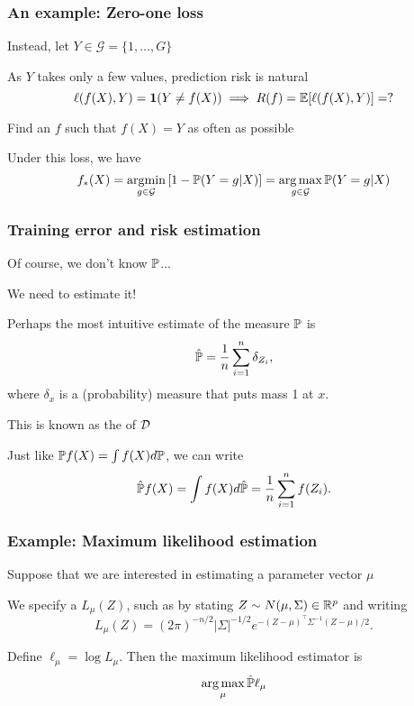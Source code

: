 \documentclass{beamer}
\begin{document}
\begin{frame}
\frametitle{An example: Zero-one loss}
Instead, let $Y \in \mathcal{G} = \{1,\ldots, G\}$ 
\vsp

As $Y$ takes only a few values,  prediction risk is natural
  \[
  \ell(f(X),Y) = \mathbf{1}(Y\neq f(X)) \; \Longrightarrow \; R(f) = \E[\ell(f(X),Y)] = ?
  \]
  

\vsp
 Find an $f$ such that $f(X) = Y$ as often
as possible

\vsp
Under this loss, we have
\[
f_*(X) = \argmin_{g \in \mathcal{G}} \left[ 1 - \P(Y = g | X)\right]  = \argmax_{g \in \mathcal{G}} \P(Y = g | X )
\]

\end{frame}



\begin{frame}
\frametitle{Training error and risk estimation}
Of course, we don't know $\P$...

\vsp
We need to estimate it!
\vsp

Perhaps the most intuitive estimate of the measure $\P$ is
\[
\hat{\P} = \frac{1}{n}\sum_{i=1}^n \delta_{Z_i},
\]
where 
$\delta_{x}$ is a (probability) measure that puts mass 1 at $x$.
\vsp

This is known as the  of $\data$
\vsp

Just like $\P f(X) = \int f(X) d \P$, we can write
\[
\hat{\P} f(X) = \int f(X) d \hat{\P} = \frac{1}{n}\sum_{i=1}^n f(Z_i).
\]
\end{frame}

\begin{frame}
\frametitle{Example: Maximum likelihood estimation}
Suppose that we are interested in estimating a parameter vector $\mu$

\vsp
We specify a  $L_\mu(Z)$, such as by stating $Z \sim N(\mu,\Sigma) \in \R^p$ and writing
\[
L_\mu(Z) = (2\pi)^{-n/2} |\Sigma|^{-1/2} e^{- (Z - \mu)^{\top} \Sigma^{-1} (Z- \mu)/2}. 
\]

Define $\ell_\mu = \log L_\mu$.  Then the maximum likelihood estimator is
\[
\argmax_\mu \hat \P \ell_\mu
\]

\end{frame}
%
%
%
\end{document}
